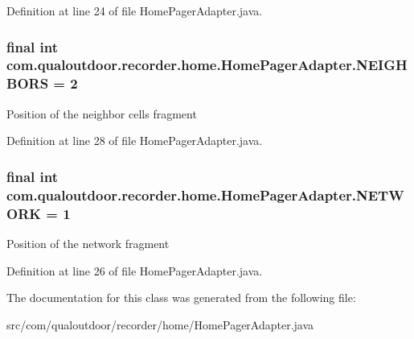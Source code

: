 Definition at line 24 of file Home\-Pager\-Adapter.\-java.

\hypertarget{classcom_1_1qualoutdoor_1_1recorder_1_1home_1_1HomePagerAdapter_ab5e43cd4f4e94b05c2d9e948928f78fc}{
\subsubsection[{N\-E\-I\-G\-H\-B\-O\-R\-S}]{\setlength{\rightskip}{0pt plus 5cm}final int com.\-qualoutdoor.\-recorder.\-home.\-Home\-Pager\-Adapter.\-N\-E\-I\-G\-H\-B\-O\-R\-S = 2\hspace{0.3cm}{\ttfamily [static]}}}\label{classcom_1_1qualoutdoor_1_1recorder_1_1home_1_1HomePagerAdapter_ab5e43cd4f4e94b05c2d9e948928f78fc}
Position of the neighbor cells fragment 

Definition at line 28 of file Home\-Pager\-Adapter.\-java.

\hypertarget{classcom_1_1qualoutdoor_1_1recorder_1_1home_1_1HomePagerAdapter_a6c9e92c7dbb64889b63eeda0a4f56669}{
\subsubsection[{N\-E\-T\-W\-O\-R\-K}]{\setlength{\rightskip}{0pt plus 5cm}final int com.\-qualoutdoor.\-recorder.\-home.\-Home\-Pager\-Adapter.\-N\-E\-T\-W\-O\-R\-K = 1\hspace{0.3cm}{\ttfamily [static]}}}\label{classcom_1_1qualoutdoor_1_1recorder_1_1home_1_1HomePagerAdapter_a6c9e92c7dbb64889b63eeda0a4f56669}
Position of the network fragment 

Definition at line 26 of file Home\-Pager\-Adapter.\-java.



The documentation for this class was generated from the following file\-:\begin{DoxyCompactItemize}
\item 
src/com/qualoutdoor/recorder/home/Home\-Pager\-Adapter.\-java\end{DoxyCompactItemize}
